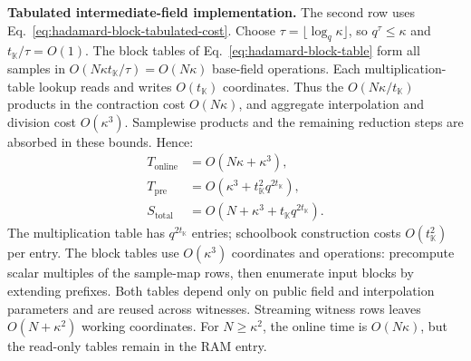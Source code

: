 \smallskip\noindent\textbf{Tabulated intermediate-field implementation.}
The second \methodname{} row uses
Eq.~\eqref{eq:hadamard-block-tabulated-cost}.
Choose \(\tau=\lfloor\log_q\kappa\rfloor\), so
\(q^\tau\leq\kappa\) and \(t_{\mathbb K}/\tau=O(1)\).
The block tables of Eq.~\eqref{eq:hadamard-block-table}
form all samples in \(O(N\kappa t_{\mathbb K}/\tau)
=O(N\kappa)\) base-field operations.
Each multiplication-table lookup reads and writes
\(O(t_{\mathbb K})\) coordinates. Thus the
\(O(N\kappa/t_{\mathbb K})\) products in the contraction
cost \(O(N\kappa)\), and aggregate interpolation and division
cost \(O(\kappa^3)\). Samplewise products and the remaining
reduction steps are absorbed in these bounds. Hence:
\begin{equation}
\begin{aligned}
T_{\mathrm{online}}&=O(N\kappa+\kappa^3),\\
T_{\mathrm{pre}}&=O(\kappa^3+t_{\mathbb K}^2q^{2t_{\mathbb K}}),\\
S_{\mathrm{total}}&=O(N+\kappa^3+t_{\mathbb K}q^{2t_{\mathbb K}}).
\end{aligned}
\label{eq:hadamard-tabulation-full-cost}
\end{equation}
The multiplication table has \(q^{2t_{\mathbb K}}\) entries;
schoolbook construction costs \(O(t_{\mathbb K}^2)\) per entry.
The block tables use \(O(\kappa^3)\) coordinates and operations:
precompute scalar multiples of the sample-map rows, then enumerate
input blocks by extending prefixes. Both tables depend only on
public field and interpolation parameters and are reused across
witnesses. Streaming witness rows leaves \(O(N+\kappa^2)\)
working coordinates. For \(N\geq\kappa^2\), the online time is
\(O(N\kappa)\), but the read-only tables remain in the RAM entry.
\fi
